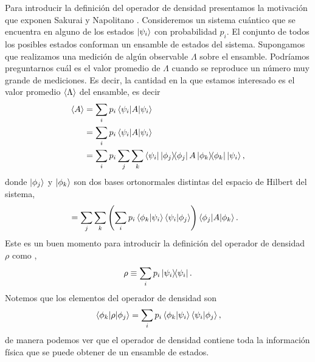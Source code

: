 Para introducir la definición del operador de densidad presentamos la 
motivación que exponen Sakurai y Napolitano \cite{sakurai_napolitano_2017}.
Consideremos un sistema cuántico que se encuentra en alguno de los estados 
$\ket{\psi_{i} }$ con probabilidad $p_i$. El conjunto de todos los posibles estados
conforman un ensamble de estados del sistema. Supongamos que realizamos 
una medición de algún observable $\Lambda$ sobre el ensamble. Podríamos 
preguntarnos cuál es el valor promedio de $\Lambda$ cuando se 
reproduce un número muy grande de mediciones. 
Es decir, la cantidad en la que estamos interesado es el 
valor promedio $\expval{\Lambda}$ del ensamble, es decir
\begin{align}
	\expval{A} &= \sum_i p_i \matrixel{\psii}{A}{\psii} \\
	&= \sum_i p_i \matrixel{\psii}{A}{\psii} \\
	&= \sum_ip_i \sum _j\sum _k
	\bra{\psii}\dyad{\phi_j}{\phi_j}A\dyad{\phi_k}{\phi_k}\Pk{i},
\end{align}
donde $\ket{\phi_j}$ y $\ket{\phi_k}$ son dos bases ortonormales distintas del
espacio de Hilbert del sistema,
\begin{align}
	&= \sum _j\sum _k \qty(\sum_ip_i \braket{\phi_k}{\psii}
	\braket{\psii}{\phi_j})	\matrixel{\phi_j}{A}{\phi_k}.
\end{align}
Este es un buen momento para introducir la definición 
del operador de densidad $\rho$ como \cite{nielsen_chuang_2011}, 
\cite{sakurai_napolitano_2017}
\begin{equation}
	\rho \equiv \sum _i p_i\dyad{\psi_i}{\psi_i}.
	\label{eq:rho_def}
\end{equation}
Notemos que los elementos del operador de densidad son
\begin{align}
	\matrixel{\phi_k}{\rho}{\phi_j} = 
	\sum_ip_i \braket{\phi_k}{\psii}\braket{\psii}{\phi_j},
\end{align}
de manera podemos ver que el operador de densidad contiene 
toda la información física que se puede obtener de un ensamble de estados.

